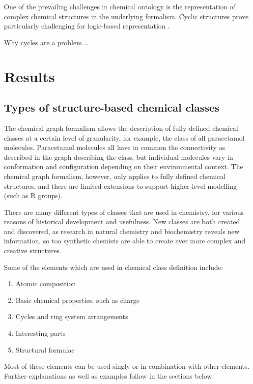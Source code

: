 \documentclass[10pt]{bmc_article}
\newenvironment{bmcformat}{\baselineskip20pt\sloppy\setboolean{publ}{false}}{\baselineskip20pt\sloppy}
\begin{document}
\begin{bmcformat}
One of the prevailing challenges in chemical ontology is the representation of complex chemical structures in the underlying formalism. Cyclic structures prove particularly challenging for logic-based representation \cite{magka2010}.  

Why cycles are a problem \ldots




\section*{Results}

\subsection*{Types of structure-based chemical classes}
\label{sec:resultsclasses}

The chemical graph formalism \cite{trinajstic1992} allows the description of fully defined chemical classes at a certain level of granularity, for example, the class of all paracetamol molecules.  Paracetamol molecules all have in common the connectivity as described in the graph describing the class, but individual molecules vary in conformation and configuration depending on their environmental context. The chemical graph formalism, however, only applies to fully defined chemical structures, and there are limited extensions to support higher-level modelling (such as R groups). 

There are many different types of classes that are used in chemistry, for various reasons of historical development and usefulness. New classes are both created and discovered, as research in natural chemistry and biochemistry reveals new information, so too synthetic chemists are able to create ever more complex and creative structures.

Some of the elements which are used in chemical class definition include: 
\begin{enumerate}
	\item Atomic composition
	\item Basic chemical properties, such as charge
	\item Cycles and ring system arrangements
	\item Interesting parts
	\item Structural formulae
\end{enumerate}

Most of these elements can be used singly or in combination with other elements.  Further explanations as well as examples follow in the sections below. 


\end{bmcformat}
\end{document}
